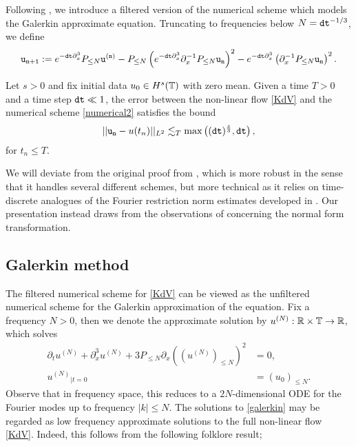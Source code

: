 Following \cite{RoussetSchratz2022}, we introduce a filtered version of the numerical scheme which models the Galerkin approximate equation. Truncating to frequencies below $N = \mathtt{dt}^{-1/3}$, we define 
\begin{equation}\label{eq:numerical2}
    \mathtt{u_{n  +1}} 
        := e^{- \mathtt{dt} \partial_x^3} P_{\leq N} \mathtt{u^{(n)}} - P_{\leq N} \left(e^{-\mathtt{dt} \partial_x^3} \partial_x^{-1} P_{\leq N} \mathtt{u_n}\right)^2 - e^{-\mathtt{dt} \partial_x^3} \left(\partial_x^{-1} P_{\leq N} \mathtt{u_n}\right)^2.
\end{equation}

    \begin{theorem}
        Let $s > 0$ and fix initial data $u_0 \in H^s (\mathbb T)$ with zero mean. Given a time $T > 0$ and a time step $\mathtt{dt} \ll 1$, the error between the non-linear flow \eqref{KdV} and the numerical scheme \eqref{numerical2} satisfies the bound 
            \begin{equation}
                ||\mathtt{u_n} - u(t_n)||_{L^2} \lesssim_T \max \left((\mathtt{dt})^{\frac{s}{3}}, \mathtt{dt} \right),
            \end{equation}
        for $t_n \leq T$. 
    \end{theorem}

We will deviate from the original proof from \cite{RoussetSchratz2022}, which is more robust in the sense that it handles several different schemes, but more technical as it relies on time-discrete analogues of the Fourier restriction norm estimates developed in \cite{CollianderEtAl2003}. Our presentation instead draws from the observations of \cite{BabinEtAl2011} concerning the normal form transformation. 

\subsection{Galerkin method}

The filtered numerical scheme for \eqref{KdV} can be viewed as the unfiltered numerical scheme for the Galerkin approximation of the equation. Fix a frequency $N > 0$, then we denote the approximate solution by $u^{(N)} : \mathbb R \times \mathbb T \to \mathbb R$, which solves
    \begin{equation}\label{eq:galerkin}
        \begin{split}
        \partial_t u^{(N)} + \partial_x^3 u^{(N)} + 3 P_{\leq N} \partial_x \left(  {(u^{(N)})}_{\leq N}\right)^2 
            &= 0, \\
        {u^{(N)}}_{|t = 0}
            &= (u_0)_{\leq N}. 
        \end{split}
    \end{equation}
Observe that in frequency space, this reduces to a $2N$-dimensional ODE for the Fourier modes up to frequency $|k| \leq N$. The solutions to \eqref{galerkin} may be regarded as low frequency approximate solutions to the full non-linear flow \eqref{KdV}. Indeed, this follows from the following folklore result; 

